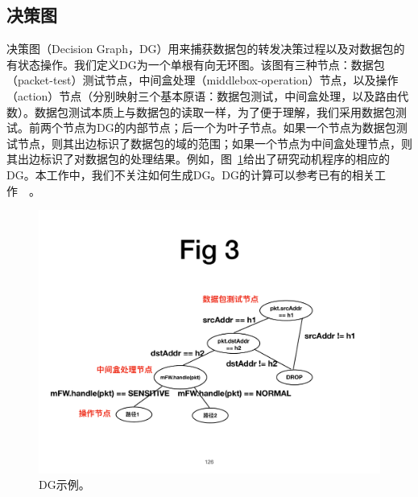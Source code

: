 \subsection{决策图}

决策图（Decision Graph，DG）用来捕获数据包的转发决策过程以及对数据包的有状态操作。我们定义DG为一个单根有向无环图。该图有三种节点：数据包（packet-test）测试节点，中间盒处理（middlebox-operation）节点，以及操作（action）节点（分别映射三个基本原语：数据包测试，中间盒处理，以及路由代数）。数据包测试本质上与数据包的读取一样，为了便于理解，我们采用数据包测试。前两个节点为DG的内部节点；后一个为叶子节点。如果一个节点为数据包测试节点，则其出边标识了数据包的域的范围；如果一个节点为中间盒处理节点，则其出边标识了对数据包的处理结果。例如，图~\ref{fig:dg-example}给出了研究动机程序的相应的DG。本工作中，我们不关注如何生成DG。DG的计算可以参考已有的相关工作~\cite{arashloo2016snap}~\cite{smolka2015fast}。


\begin{figure}[!htbp]
\centering
      \centering\includegraphics[width=\linewidth]{figures/ss-126.pdf}
\caption{DG示例。}
\label{fig:dg-example}
\end{figure}

